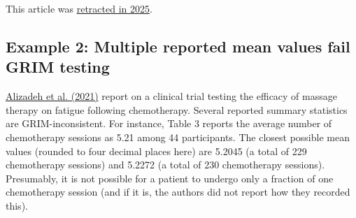\documentclass[letterpaper, 12pt]{article}
\begin{document}
This article was \href{https://doi.org/10.1177/0269215520923135}{retracted in 2025}.

\subsection*{Example 2: Multiple reported mean values fail GRIM testing}

\href{https://doi.org/10.1007/s00520-021-06304-8}{Alizadeh et al. (2021)} report on a clinical trial testing the efficacy of massage therapy on fatigue following chemotherapy. Several reported summary statistics are GRIM-inconsistent. For instance, Table 3 reports the average number of chemotherapy sessions as 5.21 among 44 participants. The closest possible mean values (rounded to four decimal places here) are 5.2045 (a total of 229 chemotherapy sessions) and 5.2272 (a total of 230 chemotherapy sessions). Presumably, it is not possible for a patient to undergo only a fraction of one chemotherapy session (and if it is, the authors did not report how they recorded this).
\end{document}
